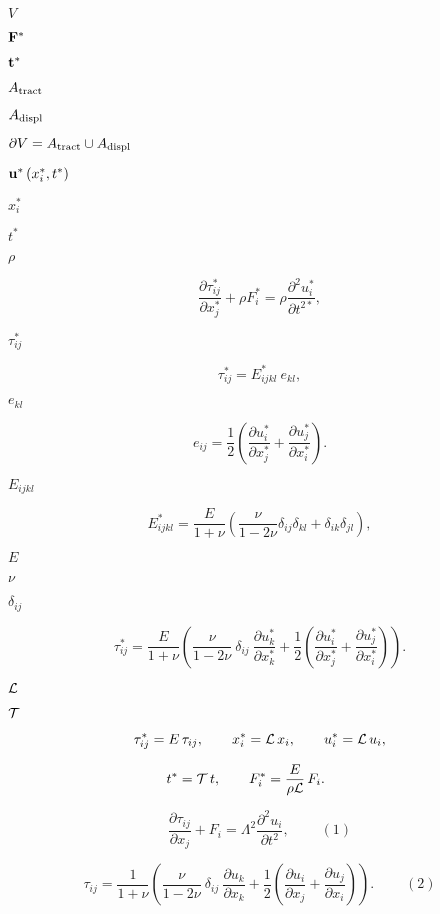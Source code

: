 \documentclass{article}
\begin{document}
$ V $
\pagebreak

$ {\bf F}^* $
\pagebreak

$ {\bf t}^* $
\pagebreak

$ A_{\rm tract} $
\pagebreak

$ A_{\rm displ} $
\pagebreak

$ \partial V = A_{\rm tract} \cup  A_{\rm displ} $
\pagebreak

$ {\bf u}^*\left( x_i^*,t^* \right) $
\pagebreak

$ x_i^* $
\pagebreak

$ t^* $
\pagebreak

$ \rho $
\pagebreak

\[
\frac{\partial \tau_{ij}^*}{\partial x_j^*} + \rho F_i^*
=
\rho \frac{\partial^2 u_i^*}{\partial t^{2*}},
\]
\pagebreak

$ \tau_{ij}^* $
\pagebreak

\[
\tau_{ij}^* = E_{ijkl}^* \ e_{kl},
\]
\pagebreak

$ e_{kl} $
\pagebreak

\[
e_{ij} = \frac{1}{2} 
\left( \frac{\partial u_i^*}{\partial x_j^*}+
       \frac{\partial u_j^*}{\partial x_i^*}\right).
\]
\pagebreak

$ E_{ijkl} $
\pagebreak

\[
E_{ijkl}^* = \frac{E}{1+\nu} \left(\frac{\nu}{1-2\nu} \delta_{ij}
 \delta_{kl} + \delta_{ik} \delta_{jl} \right),
\]
\pagebreak

$ E $
\pagebreak

$ \nu $
\pagebreak

$ \delta_{ij} $
\pagebreak

\[
\tau_{ij}^* = \frac{E}{1+\nu} \left(\frac{\nu}{1-2\nu} \ 
\delta_{ij} \ \frac{\partial u_k^*}{\partial x_k^*} + 
\frac{1}{2}\left(\frac{\partial u_i^*}{\partial x_j^*}+
\frac{\partial u_j^*}{\partial x_i^*} \right) \right).
\]
\pagebreak

$ {\cal L} $
\pagebreak

$ {\cal T} $
\pagebreak

\[
\tau_{ij}^* = E \, \tau_{ij}, \qquad
x_i^* = {\cal L}\, x_i, \qquad
u_i^* = {\cal L}\, u_i,
\]
\pagebreak

\[
t^* = {\cal T}\, t, \qquad
F_i^* = \frac{E}{\rho \cal L} \, F_i. \qquad
\]
\pagebreak

\[
\frac{\partial \tau_{ij}}{\partial x_j} + F_i
=
\Lambda^2  \frac{\partial^2 u_i}{\partial t^2},
\ \ \ \ \ \ \ \ \ \ (1)
\]
\pagebreak

\[
\tau_{ij} = \frac{1}{1+\nu} \left(\frac{\nu}{1-2\nu} \ 
\delta_{ij} \ \frac{\partial u_k}{\partial x_k} + 
\frac{1}{2} \left(\frac{\partial u_i}{\partial x_j}+
\frac{\partial u_j}{\partial x_i} \right) \right).
\ \ \ \ \ \ \ \ \ \ (2)
\]
\pagebreak
\end{document}
